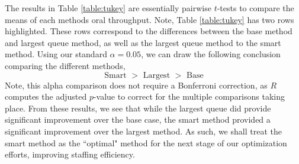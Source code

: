 \documentclass[10pt]{report}            %
\begin{document}
The results in Table \ref{table:tukey} are essentially pairwise $t$-tests to compare the means of each methods oral throughput. Note, Table \ref{table:tukey} has two rows highlighted. These rows correspond to the differences between the base method and largest queue method, as well as the largest queue method to the smart method. Using our standard $\alpha=0.05$, we can draw the following conclusion comparing the different methods,
\[\text{Smart $>$ Largest $>$ Base}\]
Note, this alpha comparison does not require a Bonferroni correction, as $R$ computes the adjusted $p$-value to correct for the multiple comparisons taking place. From these results, we see that while the largest queue did provide significant improvement over the base case, the smart method provided a significant improvement over the largest method. As such, we shall treat the smart method as the ``optimal" method for the next stage of our optimization efforts, improving staffing efficiency.
\end{document}
